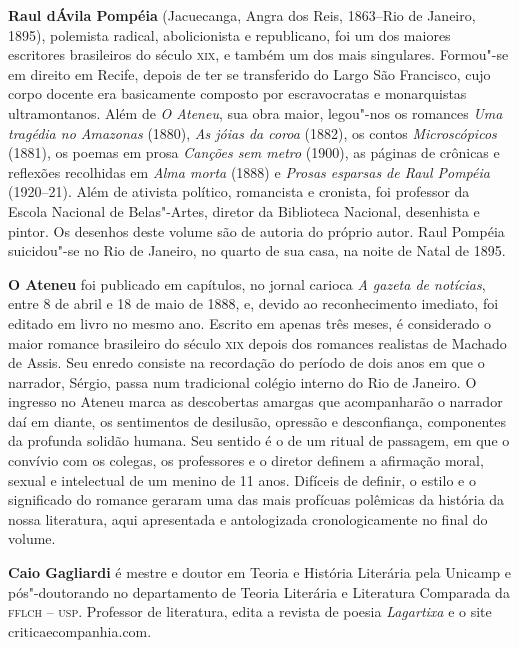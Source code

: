 \textbf{Raul dÁvila Pompéia} (Jacuecanga, Angra dos Reis, 1863--Rio de Janeiro, 1895), 
polemista radical, abolicionista e republicano, foi um dos maiores escritores
brasileiros do século \textsc{xix}, e também um dos mais singulares. Formou"-se
em direito em Recife, depois de ter se transferido do Largo São
Francisco, cujo corpo docente era basicamente composto por
escravocratas e monarquistas ultramontanos. Além de \textit{O
Ateneu}, sua obra maior, legou"-nos os romances
\textit{Uma tragédia no Amazonas} (1880),
\textit{As jóias da coroa} (1882), os contos
\textit{Microscópicos} (1881), os poemas em
prosa \textit{Canções sem metro} (1900), as páginas de crônicas 
e reflexões recolhidas em \textit{Alma
morta} (1888) e \textit{Prosas esparsas de
Raul Pompéia} (1920--21). Além de ativista político,
romancista e cronista, foi professor da Escola
Nacional de Belas"-Artes, diretor da Biblioteca Nacional, desenhista e
pintor. Os desenhos deste volume são de autoria do próprio autor. Raul
Pompéia suicidou"-se no Rio de Janeiro, no quarto de sua casa, na
noite de Natal de 1895.


\textbf{O Ateneu} foi publicado em capítulos,
no jornal carioca \textit{A gazeta de
notícias}, entre 8 de abril e 18 de maio de 1888, e,
devido ao reconhecimento imediato, foi editado em livro no mesmo ano.
Escrito em apenas três meses, é considerado o maior romance brasileiro do
século \textsc{xix} depois dos romances realistas de Machado de Assis. Seu
enredo consiste na recordação do período de dois anos em que o narrador,
Sérgio, passa num tradicional colégio interno do Rio de Janeiro. O
ingresso no Ateneu marca as descobertas amargas que acompanharão o
narrador daí em diante, os sentimentos de desilusão, opressão e
desconfiança, componentes da profunda solidão humana. Seu sentido é o
de um ritual de passagem, em que o convívio com os colegas, os
professores e o diretor definem a afirmação moral, sexual e intelectual
de um menino de 11 anos. Difíceis de definir, o estilo e o
significado do romance geraram uma das mais profícuas polêmicas da
história da nossa literatura, aqui apresentada e antologizada
cronologicamente no final do volume.


\textbf{Caio Gagliardi} é mestre e doutor em Teoria e
História Literária pela Unicamp e pós"-doutorando no departamento de
Teoria Literária e Literatura Comparada da \textsc{fflch -- usp}. Professor de
literatura, edita a revista de poesia \textit{Lagartixa}
e o site criticaecompanhia.com.


